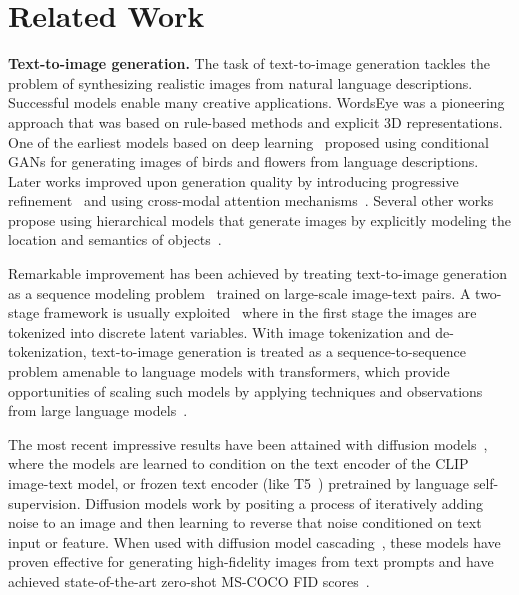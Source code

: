 \section{Related Work}
\textbf{Text-to-image generation.} 
The task of text-to-image generation tackles the problem of synthesizing realistic images from natural language descriptions. Successful models enable many creative applications. WordsEye \cite{coyne2001wordseye} was a pioneering approach that was based on rule-based methods and explicit 3D representations. One of the earliest models based on deep learning~\cite{reed2016generative} proposed using conditional GANs for generating images of birds and flowers from language descriptions. Later works improved upon generation quality by introducing progressive refinement~\cite{Han17, Han17stackgan2} and using cross-modal attention mechanisms~\cite{Xu18, zhang2021cross}. Several other works propose using hierarchical models that generate images by explicitly modeling the location and semantics of objects~\cite{reed2016learning, HongYCL18, HinzHW19, trecs2020}.

Remarkable improvement has been achieved by treating text-to-image generation as a sequence modeling problem~\cite{Esser21vqgan, ding2021cogview, ramesh2021zero, gafni2022make, dallemini} trained on large-scale image-text pairs. A two-stage framework is usually exploited~\cite{yu2021vector, chang2022maskgit} where in the first stage the images are tokenized into discrete latent variables. With image tokenization and de-tokenization, text-to-image generation is treated as a sequence-to-sequence problem amenable to language models with transformers, which provide opportunities of scaling such models by applying techniques and observations from large language models~\cite{radford2018improving, du2021glam, chowdhery2022palm, hoffmann2022training}.

The most recent impressive results have been attained with diffusion models~\cite{nichol2021glide, ramesh2022hierarchical, imagen}, where the models are learned to condition on the text encoder of the CLIP~\cite{radford2021learning} image-text model, or frozen text encoder (like T5~\cite{raffel2019exploring}) pretrained by language self-supervision. Diffusion models work by positing a process of iteratively adding noise to an image and then learning to reverse that noise conditioned on text input or feature. When used with diffusion model cascading~\cite{ho2022cascaded}, these models have proven effective for generating high-fidelity images from text prompts and have achieved state-of-the-art zero-shot MS-COCO FID scores~\cite{imagen}.

